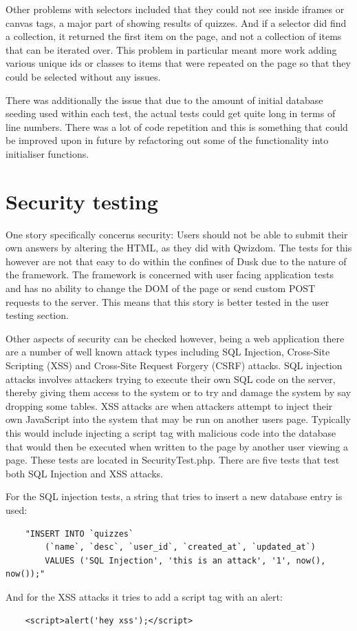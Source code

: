 Other problems with selectors included that they could not see inside iframes or canvas tags, a major part of showing results of quizzes. And if a selector did find a collection, it returned the first item on the page, and not a collection of items that can be iterated over. This problem in particular meant more work adding various unique ids or classes to items that were repeated on the page so that they could be selected without any issues.

There was additionally the issue that due to the amount of initial database seeding used within each test, the actual tests could get quite long in terms of line numbers. There was a lot of code repetition and this is something that could be improved upon in future by refactoring out some of the functionality into initialiser functions.

\section{Security testing}
\label{testing:security}
One story specifically concerns security: Users should not be able to submit their own answers by altering the HTML, as they did with Qwizdom. The tests for this however are not that easy to do within the confines of Dusk due to the nature of the framework. The framework is concerned with user facing application tests and has no ability to change the DOM of the page or send custom POST requests to the server. This means that this story is better tested in the user testing section.

Other aspects of security can be checked however, being a web application there are a number of well known attack types including SQL Injection, Cross-Site Scripting (XSS) and Cross-Site Request Forgery (CSRF) attacks. SQL injection attacks involves attackers trying to execute their own SQL code on the server, thereby giving them access to the system or to try and damage the system by say dropping some tables. XSS attacks are when attackers attempt to inject their own JavaScript into the system that may be run on another users page. Typically this would include injecting a script tag with malicious code into the database that would then be executed when written to the page by another user viewing a page. These tests are located in SecurityTest.php. There are five tests that test both SQL Injection and XSS attacks.  

For the SQL injection tests, a string that tries to insert a new database entry is used:
\begin{verbatim}
	"INSERT INTO `quizzes` 
		(`name`, `desc`, `user_id`, `created_at`, `updated_at`) 
		VALUES ('SQL Injection', 'this is an attack', '1', now(), now());"
\end{verbatim}
And for the XSS attacks it tries to add a script tag with an alert:
\begin{verbatim}
	<script>alert('hey xss');</script>
\end{verbatim} 

